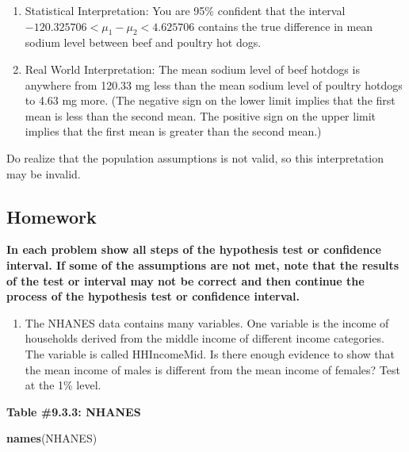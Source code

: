 \documentclass[
]{book}
\newenvironment{Shaded}{\begin{snugshade}}{\end{snugshade}}
\newcommand{\KeywordTok}[1]{\textcolor[rgb]{0.13,0.29,0.53}{\textbf{#1}}}
\newcommand{\NormalTok}[1]{#1}
\providecommand{\tightlist}{%
  \setlength{\itemsep}{0pt}\setlength{\parskip}{0pt}}
\begin{document}
\begin{enumerate}
\def\labelenumi{\arabic{enumi}.}
\setcounter{enumi}{3}
\item
  Statistical Interpretation: You are 95\% confident that the interval \(-120.325706<\mu_1-\mu_2<4.625706\) contains the true difference in mean sodium level between beef and poultry hot dogs.
\item
  Real World Interpretation: The mean sodium level of beef hotdogs is anywhere from 120.33 mg less than the mean sodium level of poultry hotdogs to 4.63 mg more. (The negative sign on the lower limit implies that the first mean is less than the second mean. The positive sign on the upper limit implies that the first mean is greater than the second mean.)
\end{enumerate}

Do realize that the population assumptions is not valid, so this interpretation may be invalid.

\hypertarget{homework-24}{%
\subsection{Homework}\label{homework-24}}

\textbf{In each problem show all steps of the hypothesis test or confidence interval. If some of the assumptions are not met, note that the results of the test or interval may not be correct and then continue the process of the hypothesis test or confidence interval.}

\begin{enumerate}
\def\labelenumi{\arabic{enumi}.}
\tightlist
\item
  The NHANES data contains many variables. One variable is the income of households derived from the middle income of different income categories. The variable is called HHIncomeMid. Is there enough evidence to show that the mean income of males is different from the mean income of females? Test at the 1\% level.
\end{enumerate}

\textbf{Table \#9.3.3: NHANES}

\begin{Shaded}
\begin{Highlighting}[]
\KeywordTok{names}\NormalTok{(NHANES)}
\end{Highlighting}
\end{Shaded}
\end{document}

